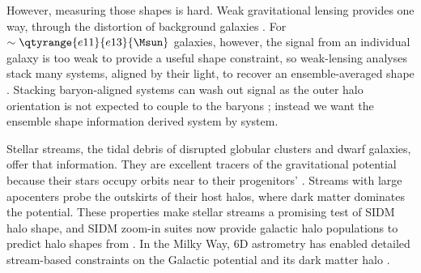 \documentclass[linenumbers,twocolumn]{aastex701}
\begin{document}
    However, measuring those shapes is hard. %
    Weak gravitational lensing provides one way, through the distortion of background galaxies \citep{Bartelmann+Schneider:2001:WeakGravitationalLensing}. %
    For $\sim\qtyrange{e11}{e13}{\Msun}$ galaxies, however, the signal from an individual galaxy is too weak to provide a useful shape constraint, so weak-lensing analyses stack many systems, aligned by their light, to recover an ensemble-averaged shape \citep{vanUitert+:2012:ConstraintsShapesGalaxy,Schrabback+:2021:TighteningWeakLensing}. %
    Stacking baryon-aligned systems can wash out signal as the outer halo orientation is not expected to couple to the baryons \citep{Bett:2012:HaloShapesWeak}; instead we want the ensemble shape information derived system by system. %

    Stellar streams, the tidal debris of disrupted globular clusters and dwarf galaxies, offer that information. %
    They are excellent tracers of the gravitational potential because their stars occupy orbits near to their progenitors' \citep{Johnston:1998:PrescriptionBuildingMilky,Kupper+:2012:MoreStructureTidal}. %
    Streams with large apocenters probe the outskirts of their host halos, where dark matter dominates the potential. %
    These properties make stellar streams a promising test of \gls{SIDM} halo shape, and \gls{SIDM} zoom-in suites now provide galactic halo populations to predict halo shapes from \citep[e.g.\,][]{Nadler+:2025:SIDMConcertoCompilation}. %
    In the Milky Way, 6D astrometry has enabled detailed stream-based constraints on the Galactic potential and its dark matter halo \citep{Law+Majewski:2010:SagittariusDwarfGalaxy,Koposov+:2010:ConstrainingMilkyWay,Bovy+:2016:SHAPEINNERMILKY,Bonaca+Hogg:2018:InformationContentCold,Vasiliev+:2021:TangoThreeSagittarius,Ibata2023ChartingDR3,Bariego-Quintana:2024:TorsionStellarStreams}. %
\end{document}
